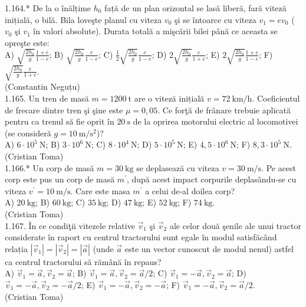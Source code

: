 1.164.* De la o înălțime $h_{0}$ față de un plan orizontal se lasă liberă, fară viteză inițială, o bilă. Bila loveşte planul cu viteza $v_{0}$ şi se întoarce cu viteza $v_{1}=e v_{0}$ ($v_{0}$ şi $v_{1}$ în valori absolute). Durata totală a mişcării bilei până ce aceasta se opreşte este:\\ A) $\sqrt{\frac{2 h_{0}}{g}} \frac{1+e}{1-e}$; B) $\sqrt{\frac{2 h_{0}}{g}} \frac{e}{1-e}$; C) $\frac{1}{2} \sqrt{\frac{2 h_{0}}{g}} \frac{e}{1-e}$; D) $2 \sqrt{\frac{2 h_{0}}{g}} \frac{e}{1+e}$; E) $2 \sqrt{\frac{2 h_{0}}{g}} \frac{1+e}{1-e}$; F) $\sqrt{\frac{2 h_{0}}{g}} \frac{e}{1+e}$.\\ (Constantin Neguțu)\\

1.165. Un tren de masă $m=1200 \mathrm{~t}$ are o viteză inițială $v=72 \mathrm{~km} / \mathrm{h}$. Coeficientul de frecare dintre tren şi şine este $\mu=0,05$. Ce forţă de frânare trebuie aplicată pentru ca trenul să fie oprit în $20 \mathrm{~s}$ de la oprirea motorului electric al locomotivei (se consideră $g=10 \mathrm{~m} / \mathrm{s}^{2}$)?\\ A) $6 \cdot 10^{5} \mathrm{~N}$; B) $3 \cdot 10^{6} \mathrm{~N}$; C) $8 \cdot 10^{4} \mathrm{~N}$; D) $5 \cdot 10^{5} \mathrm{~N}$; E) $4,5 \cdot 10^{6} \mathrm{~N}$; F) $8,3 \cdot 10^{5} \mathrm{~N}$.\\ (Cristian Toma)\\

1.166.* Un corp de masă $m=30 \mathrm{~kg}$ se deplasează cu viteza $v=30 \mathrm{~m} / \mathrm{s}$. Pe acest corp este pus un corp de masă $m^{\prime}$, după acest impact corpurile deplasându-se cu viteza $v^{\prime}=10 \mathrm{~m} / \mathrm{s}$. Care este masa $m^{\prime}$ a celui de-al doilea corp?\\ A) $20 \mathrm{~kg}$; B) $60 \mathrm{~kg}$; C) $35 \mathrm{~kg}$; D) $47 \mathrm{~kg}$; E) $52 \mathrm{~kg}$; F) $74 \mathrm{~kg}$.\\ (Cristian Toma)\\

1.167. În ce condiţii vitezele relative $\vec{v}_{1}$ şi $\vec{v}_{2}$ ale celor două şenile ale unui tractor considerate în raport cu centrul tractorului sunt egale în modul satisfăcând relația $\left|\vec{v}_{1}\right|=\left|\vec{v}_{2}\right|=|\vec{a}|$ (unde $\vec{a}$ este un vector cunoscut de modul nenul) astfel ca centrul tractorului să rămână în repaus?\\ A) $\vec{v}_{1}=\vec{a}, \vec{v}_{2}=\vec{a}$; B) $\vec{v}_{1}=\vec{a}, \vec{v}_{2}=\vec{a} / 2$; C) $\vec{v}_{1}=-\vec{a}, \vec{v}_{2}=\vec{a}$; D) $\vec{v}_{1}=-\vec{a}, \vec{v}_{2}=-\vec{a} / 2$; E) $\vec{v}_{1}=-\vec{a}, \vec{v}_{2}=-\vec{a}$; F) $\vec{v}_{1}=-\vec{a}, \vec{v}_{2}=\vec{a} / 2$.\\ (Cristian Toma)\\

